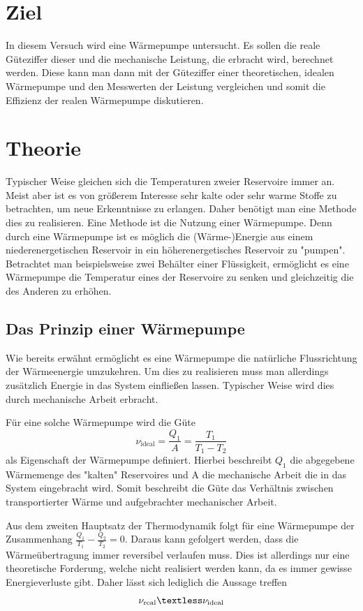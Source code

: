 \section{Ziel}
\label{sec:Zielsetzung}
In diesem Versuch wird eine Wärmepumpe untersucht. Es sollen die reale Güteziffer dieser und die mechanische Leistung, die erbracht wird, berechnet werden. 
Diese kann man dann mit der Güteziffer einer theoretischen, idealen Wärmepumpe und den Messwerten der Leistung vergleichen und somit die Effizienz der realen Wärmepumpe diskutieren.
\section{Theorie}
\label{sec:Theorie}
Typischer Weise gleichen sich die Temperaturen zweier Reservoire immer an. Meist aber ist es von größerem Interesse sehr kalte oder sehr warme Stoffe zu betrachten, um neue Erkenntnisse
zu erlangen. Daher benötigt man eine Methode dies zu realisieren. Eine Methode ist die Nutzung einer Wärmepumpe. Denn durch eine Wärmepumpe ist es möglich die (Wärme-)Energie aus 
einem niederenergetischen Reservoir in ein höherenergetisches Reservoir zu "pumpen". Betrachtet man beispielsweise zwei Behälter einer Flüssigkeit, ermöglicht es eine Wärmepumpe 
die Temperatur eines der Reservoire zu senken und gleichzeitig die des Anderen zu erhöhen. 
\subsection{Das Prinzip einer Wärmepumpe}
\label{subsec:Prinzip}
Wie bereits erwähnt ermöglicht es eine Wärmepumpe die natürliche Flussrichtung der Wärmeenergie umzukehren. Um dies zu realisieren muss man allerdings zusätzlich Energie in das System
einfließen lassen. Typischer Weise wird dies durch mechanische Arbeit erbracht.


Für eine solche Wärmepumpe wird die Güte
\begin{equation}
    \label{eqn:Güte_ideal}
    \nu_{\text{ideal}} = \frac{Q_1}{A} = \frac{T_1}{T_1 - T_2}
\end{equation}
als Eigenschaft der Wärmepumpe definiert. Hierbei beschreibt $Q_1$ die abgegebene Wärmemenge des "kalten"\: Reservoires und A die mechanische Arbeit die in das System eingebracht wird.
Somit beschreibt die Güte das Verhältnis zwischen transportierter Wärme und aufgebrachter mechanischer Arbeit. 


Aus dem zweiten Hauptsatz der Thermodynamik folgt für eine Wärmepumpe der Zusammenhang $\frac{Q_1}{T_1} - \frac{Q_2}{T_2} = 0$. Daraus kann gefolgert werden, dass die Wärmeübertragung 
immer reversibel verlaufen muss. Dies ist allerdings nur eine theoretische Forderung, welche nicht realisiert werden kann, da es immer gewisse Energieverluste gibt. Daher lässt sich
lediglich die Aussage treffen 
\begin{equation*}
    \label{eqn:Güte_real}
    \nu_{\text{real}} \textless \nu_{\text{ideal}}
\end{equation*}

